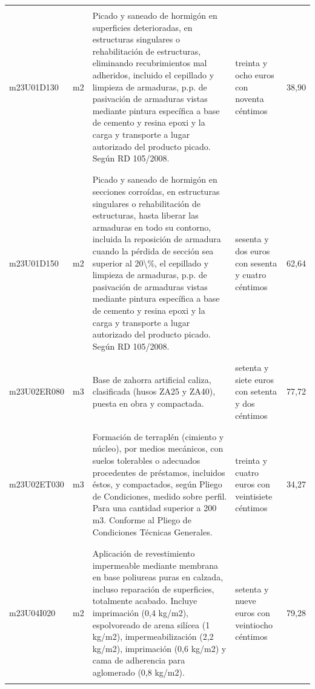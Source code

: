 \documentclass{book}%
\begin{document}
\begin{longtable}{|l|l|p{5cm}|p{3cm}|r|}
&&&&\\%
m23U01D130&m2&Picado y saneado de hormigón en superficies deterioradas, en estructuras singulares o rehabilitación de estructuras, eliminando recubrimientos mal adheridos, incluido el cepillado y limpieza de armaduras, p.p. de pasivación de armaduras vistas mediante pintura específica a base de cemento y resina epoxi y la carga y transporte a lugar autorizado del producto picado. Según RD 105/2008.&treinta y ocho euros con noventa céntimos&38,90\\%
&&&&\\%
&&&&\\%
m23U01D150&m2&Picado y saneado de hormigón en secciones corroídas, en estructuras singulares o rehabilitación de estructuras, hasta liberar las armaduras en todo su contorno, incluida la reposición de armadura cuando la pérdida de sección sea superior al 20\textbackslash{}\%, el cepillado y limpieza de armaduras, p.p. de pasivación de armaduras vistas mediante pintura específica a base de cemento y resina epoxi y la carga y transporte a lugar autorizado del producto picado. Según RD 105/2008.&sesenta y dos euros con sesenta y cuatro céntimos&62,64\\%
&&&&\\%
&&&&\\%
m23U02ER080&m3&Base de zahorra artificial caliza, clasificada (husos ZA25 y ZA40), puesta en obra y compactada.&setenta y siete euros con setenta y dos céntimos&77,72\\%
&&&&\\%
&&&&\\%
m23U02ET030&m3&Formación de terraplén (cimiento y núcleo), por medios mecánicos, con suelos tolerables o adecuados procedentes de préstamos, incluidos éstos, y compactados, según Pliego de Condiciones, medido sobre perfil. Para una cantidad superior a 200 m3. Conforme al Pliego de Condiciones Técnicas Generales.&treinta y cuatro euros con veintisiete céntimos&34,27\\%
&&&&\\%
&&&&\\%
m23U04I020&m2&Aplicación de revestimiento impermeable mediante membrana en base poliureas puras en calzada, incluso reparación de superficies, totalmente acabado. Incluye imprimación (0,4 kg/m2), espolvoreado de arena silícea (1 kg/m2), impermeabilización (2,2 kg/m2), imprimación (0,6 kg/m2) y cama de adherencia para aglomerado (0,8 kg/m2).&setenta y nueve euros con veintiocho céntimos&79,28\\%
&&&&\\%

\end{longtable}
\end{document}
